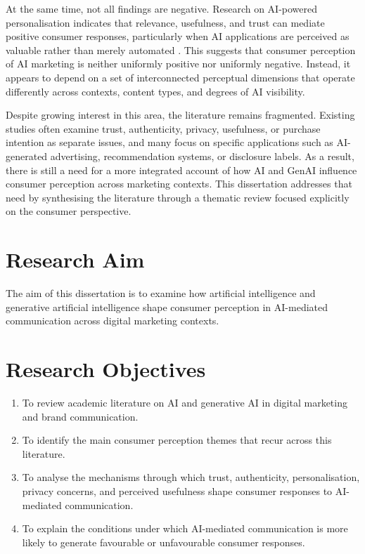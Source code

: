 At the same time, not all findings are negative. Research on AI-powered personalisation indicates that relevance, usefulness, and trust can mediate positive consumer responses, particularly when AI applications are perceived as valuable rather than merely automated \cite{an2025personalized,srivastava2026social}. This suggests that consumer perception of AI marketing is neither uniformly positive nor uniformly negative. Instead, it appears to depend on a set of interconnected perceptual dimensions that operate differently across contexts, content types, and degrees of AI visibility.

Despite growing interest in this area, the literature remains fragmented. Existing studies often examine trust, authenticity, privacy, usefulness, or purchase intention as separate issues, and many focus on specific applications such as AI-generated advertising, recommendation systems, or disclosure labels. As a result, there is still a need for a more integrated account of how AI and GenAI influence consumer perception across marketing contexts. This dissertation addresses that need by synthesising the literature through a thematic review focused explicitly on the consumer perspective.

\section{Research Aim}
The aim of this dissertation is to examine how artificial intelligence and generative artificial intelligence shape consumer perception in AI-mediated communication across digital marketing contexts.

\section{Research Objectives}
\begin{enumerate}
    \item To review academic literature on AI and generative AI in digital marketing and brand communication.
    \item To identify the main consumer perception themes that recur across this literature.
    \item To analyse the mechanisms through which trust, authenticity, personalisation, privacy concerns, and perceived usefulness shape consumer responses to AI-mediated communication.
    \item To explain the conditions under which AI-mediated communication is more likely to generate favourable or unfavourable consumer responses.
\end{enumerate}

